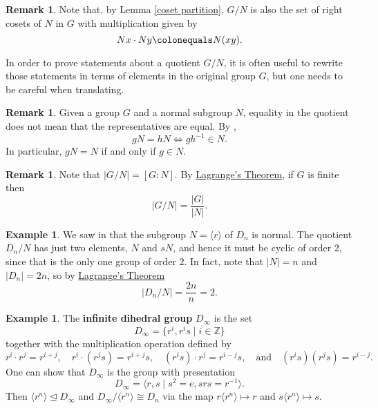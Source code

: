 \documentclass[12pt]{report}
\numberwithin{equation}{section}
\numberwithin{theorem}{chapter}
\theoremstyle{definition}
\newtheorem{example}[theorem]{Example}
\newtheorem*{basic properties}{Basic Properties}
\newtheorem*{Important Remark}{Important Remark}
\newtheorem{remark}[theorem]{Remark}
\newcommand{\df}[1]{{\bf #1}\index{#1}}
\begin{document}
\begin{remark}
	Note that, by  Lemma \ref{coset partition}, $G/N$ is also the set of right  cosets of $N$ in $G$ with multiplication given by 
	$$Nx\cdot Ny \colonequals N(xy).$$
\end{remark}


In order to prove statements about a quotient $G/N$, it is often useful to rewrite those statements in terms of elements in the original group $G$, but one needs to be careful when translating.

\begin{remark}
	Given a group $G$ and a normal subgroup $N$, equality in the quotient does not mean that the representatives are equal. By , 
	$$gN = hN \iff gh^{-1} \in N.$$ 
	In particular, $gN = N$ if and only if $g \in N$.
\end{remark}





\begin{remark}\label{order of quotient}
Note that $|G/N| = [G :N ]$. By \hyperref[Lagrange]{Lagrange's Theorem}, if $G$ is finite then
$$\left | G/N\right | = \frac{|G|}{|N|}.$$
\end{remark}




\begin{example}\label{example quotient of D_n by rotations}
We saw in  that the subgroup $N = \langle r \rangle$ of $D_{n}$ is normal. The quotient $D_{n}/N$ has just two elements, $N$ and $sN$, and hence it must be cyclic of order $2$, since that is the only one group of order $2$. In fact, note that $|N| = n$ and $|D_n| = 2n$, so by \hyperref[Lagrange]{Lagrange's Theorem} 
$$|D_n/N| = \frac{2n}{n} =2.$$
\end{example}




\begin{example}\label{example D_infty}
	The \df{infinite dihedral group} $D_\infty$ is the set 
	$$D_\infty = \{r^i,r^is \mid i \in \mathbb{Z}\}$$ 
	together with the multiplication operation defined by 
	$$r^i \cdot r^j = r^{i+j}, \quad r^i \cdot (r^js) = r^{i+j}s, \quad (r^is) \cdot r^j = r^{i-j}s, \quad \textrm{and} \quad (r^is)(r^js) = r^{i-j}.$$
One can show that $D_\infty$ is the group with presentation
$$D_\infty=\langle r,s \mid s^2=e, srs=r^{-1}\rangle.$$
Then $\langle r^n \rangle \trianglelefteq D_\infty$ and $D_\infty/ \langle r^n \rangle \cong D_{n}$ via the map $r\langle r^n \rangle\mapsto r$ and $s\langle r^n \rangle\mapsto s$.
\end{example}
\end{document}
